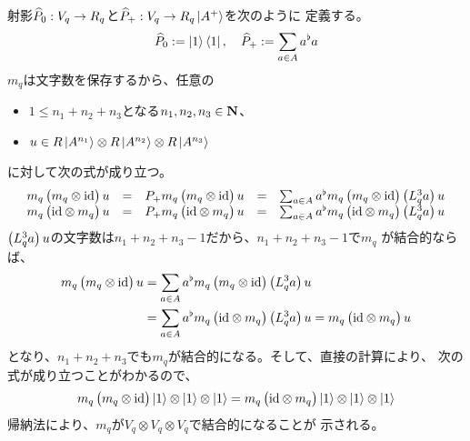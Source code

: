 {	射影$\Phat_0:V_q\to R_q$と$\Phat_+:V_q\to R_q\ket{A^+}$を次のように
	定義する。
	\begin{equation*}\begin{split}
		\Phat_0 := \ket{1}\bra{1},\quad \Phat_+ := \sum_{a\in A}a^\flat a
	\end{split}\end{equation*}
	$m_q$は文字数を保存するから、任意の
	\begin{itemize}\setlength{\itemsep}{-1mm} %
		\item $1\le n_1 + n_2 + n_3$となる$n_1,n_2,n_3\in\sizen$、
		\item $u\in R\ket{A^{n_1}}\otimes R\ket{A^{n_2}}\otimes R\ket{A^{n_3}}$
	\end{itemize} %
	に対して次の式が成り立つ。
	\begin{equation*}\begin{array}{rclcl}
		m_q\gplr{m_q\otimes\id} u &=& P_+m_q\gplr{m_q\otimes\id} u
		&=& \sum_{a\in A}a^\flat m_q\gplr{m_q\otimes\id}\gplr{L_q^3a} u \\
		m_q\gplr{\id\otimes m_q} u &=& P_+m_q\gplr{\id\otimes m_q} u
		&=& \sum_{a\in A}a^\flat m_q\gplr{\id\otimes m_q}\gplr{L_q^3a} u
	\end{array}\end{equation*}
	$\gplr{L_q^3a} u$の文字数は$n_1+n_2+n_3-1$だから、$n_1+n_2+n_3-1$で$m_q$
	が結合的ならば、
	\begin{equation*}\begin{split}
		m_q\gplr{m_q\otimes\id} u 
		&= \sum_{a\in A}a^\flat m_q\gplr{m_q\otimes\id}\gplr{L_q^3a} u \\
		&= \sum_{a\in A}a^\flat m_q\gplr{\id\otimes m_q}\gplr{L_q^3a} u
		= m_q\gplr{\id\otimes m_q} u \\
	\end{split}\end{equation*}
	となり、$n_1+n_2+n_3$でも$m_q$が結合的になる。そして、直接の計算により、
	次の式が成り立つことがわかるので、
	\begin{equation*}\begin{split}
		m_q\gplr{m_q\otimes\id}\ket{1}\otimes\ket{1}\otimes\ket{1}
		= m_q\gplr{\id\otimes m_q}\ket{1}\otimes\ket{1}\otimes\ket{1}
	\end{split}\end{equation*}
	帰納法により、$m_q$が$V_q\otimes V_q\otimes V_q$で結合的になることが
	示される。
}
